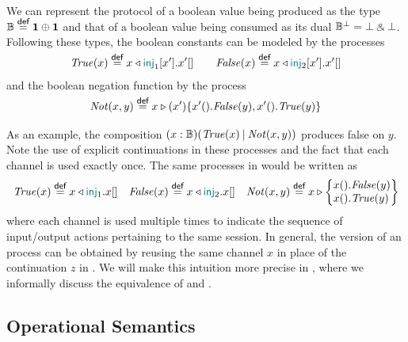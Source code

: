 \begin{example}
    \label{ex:booleans}
    We can represent the protocol of a boolean value being produced as the type
    $\mathbb{B} \stackrel{\smash{\textsf{\footnotesize def}}}= \mathbf{1} \mathbin\oplus \mathbf{1}$ and that of a boolean value being consumed as
    its dual $\mathbb{B}^{\bot} = \bot \mathbin\binampersand \bot$. Following these types, the boolean
    constants can be modeled by the processes
    \[
        \TrueP(x) \eqdef \Select\x\LeftTag{x'}.\Close{x'}
        \qquad
        \FalseP(x) \eqdef \Select\x\RightTag{x'}.\Close{x'}
    \]
    and the boolean negation function by the process
    \[
        \NotP(x,y) \eqdef
        \Case\x{x'}{
            \Wait{x'}.\FalseP(y)
        }{
            \Wait{x'}.\TrueP(y)
        }
    \]

    As an example, the composition $\Cut[\Bool]\x{\TrueP(x)}{\NotP(x,y)}$
    produces false on $y$.
    Note the use of explicit continuations in these processes and the fact that
    each channel is used exactly once. The same processes in \CP would be
    written as
    \[
        \TrueP(x) \eqdef \Select\x\LeftTag{}.\Close\x
        \quad
        \FalseP(x) \eqdef \Select\x\RightTag{}.\Close\x
        \quad
        \NotP(x,y) \eqdef
        \BigCase\x{}{
            \Wait\x.\FalseP(y)
        }{
            \Wait\x.\TrueP(y)
        }
    \]
    where each channel is used multiple times to indicate the sequence of
    input/output actions pertaining to the same session.
    In general, the \CP version of an \Calculus process can be obtained by
    reusing the same channel $x$ in place of the continuation $z$ in
    . We will make this intuition more precise in
    , where we informally discuss the equivalence of \CP
    and \Calculus.
    \eoe
\end{example}

\subsection{Operational Semantics}
\label{sec:semantics}


